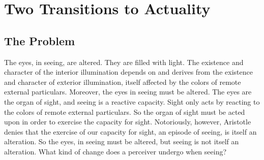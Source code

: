 \chapter{Two Transitions to Actuality} %
\label{cha:two_kinds_of_potentiality}

\section{The Problem} %
\label{sec:the_problem}

The eyes, in seeing, are altered. They are filled with light. The existence and character of the interior illumination depends on and derives from the existence and character of exterior illumination, itself affected by the colors of remote external particulars. Moreover, the eyes in seeing must be altered. The eyes are the organ of sight, and seeing is a reactive capacity. Sight only acts by reacting to the colors of remote external particulars. So the organ of sight must be acted upon in order to exercise the capacity for sight. Notoriously, however, Aristotle denies that the exercise of our capacity for sight, an episode of seeing, is itself an alteration. So the eyes, in seeing must be altered, but seeing is not itself an alteration. What kind of change does a perceiver undergo when seeing?




